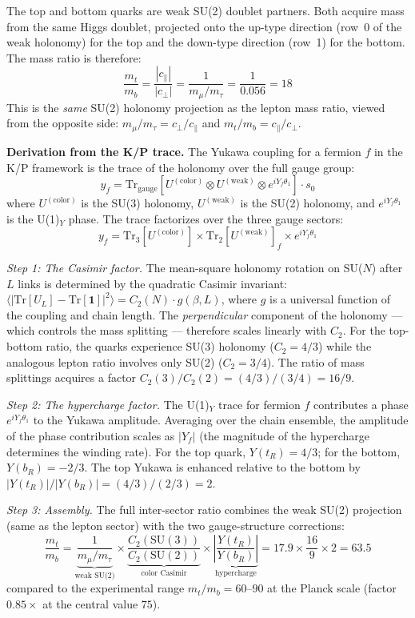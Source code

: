 \documentclass[11pt,letterpaper]{article}
\begin{document}
The top and bottom quarks are weak SU(2) doublet partners.  Both
acquire mass from the same Higgs doublet, projected onto the up-type
direction (row~0 of the weak holonomy) for the top and the down-type
direction (row~1) for the bottom.  The mass ratio is therefore:
\[
  \frac{m_t}{m_b} = \frac{|c_\parallel|}{|c_\perp|}
  = \frac{1}{m_\mu/m_\tau} = \frac{1}{0.056} = 18
\]
This is the \emph{same} SU(2) holonomy projection as the lepton mass
ratio, viewed from the opposite side: $m_\mu/m_\tau = c_\perp/c_\parallel$
and $m_t/m_b = c_\parallel/c_\perp$.

\medskip
\noindent\textbf{Derivation from the K/P trace.}
The Yukawa coupling for a fermion $f$ in the K/P framework is
the trace of the holonomy over the full gauge group:
\[
  y_f = \mathrm{Tr}_{\mathrm{gauge}}\!\left[
    U^{(\mathrm{color})} \otimes U^{(\mathrm{weak})}
    \otimes e^{iY_f\theta_1}
  \right] \cdot s_0
\]
where $U^{(\mathrm{color})}$ is the SU(3) holonomy,
$U^{(\mathrm{weak})}$ is the SU(2) holonomy, and
$e^{iY_f\theta_1}$ is the U(1)$_Y$ phase. The trace factorizes
over the three gauge sectors:
\[
  y_f = \mathrm{Tr}_3\!\left[U^{(\mathrm{color})}\right]
  \times \mathrm{Tr}_2\!\left[U^{(\mathrm{weak})}\right]_f
  \times e^{iY_f\theta_1}
\]

\noindent\textit{Step 1: The Casimir factor.}
The mean-square holonomy rotation on SU($N$) after $L$ links is
determined by the quadratic Casimir invariant:
$\langle|\mathrm{Tr}[U_L] - \mathrm{Tr}[\mathbf{1}]|^2\rangle
= C_2(N) \cdot g(\beta, L)$, where $g$ is a universal function of
the coupling and chain length. The \emph{perpendicular} component
of the holonomy --- which controls the mass splitting --- therefore
scales linearly with $C_2$. For the top-bottom ratio, the quarks
experience SU(3) holonomy ($C_2 = 4/3$) while the analogous lepton
ratio involves only SU(2) ($C_2 = 3/4$). The ratio of mass
splittings acquires a factor $C_2(3)/C_2(2) = (4/3)/(3/4) = 16/9$.

\noindent\textit{Step 2: The hypercharge factor.}
The U(1)$_Y$ trace for fermion $f$ contributes a phase
$e^{iY_f\theta_1}$ to the Yukawa amplitude. Averaging over the
chain ensemble, the amplitude of the phase contribution scales as
$|Y_f|$ (the magnitude of the hypercharge determines the winding
rate). For the top quark, $Y(t_R) = 4/3$; for the bottom,
$Y(b_R) = -2/3$. The top Yukawa is enhanced relative to the bottom
by $|Y(t_R)|/|Y(b_R)| = (4/3)/(2/3) = 2$.

\noindent\textit{Step 3: Assembly.}
The full inter-sector ratio combines the weak SU(2) projection
(same as the lepton sector) with the two gauge-structure corrections:
\[
  \frac{m_t}{m_b} = \underbrace{\frac{1}{m_\mu/m_\tau}}_{\text{weak
  SU(2)}} \times \underbrace{\frac{C_2(\mathrm{SU}(3))}
  {C_2(\mathrm{SU}(2))}}_{\text{color Casimir}} \times
  \underbrace{\left|\frac{Y(t_R)}{Y(b_R)}\right|}_{\text{hypercharge}}
  = 17.9 \times \frac{16}{9} \times 2 = 63.5
\]
compared to the experimental range $m_t/m_b = 60$--$90$ at the Planck
scale (factor $0.85\times$ at the central value $75$).
\end{document}
